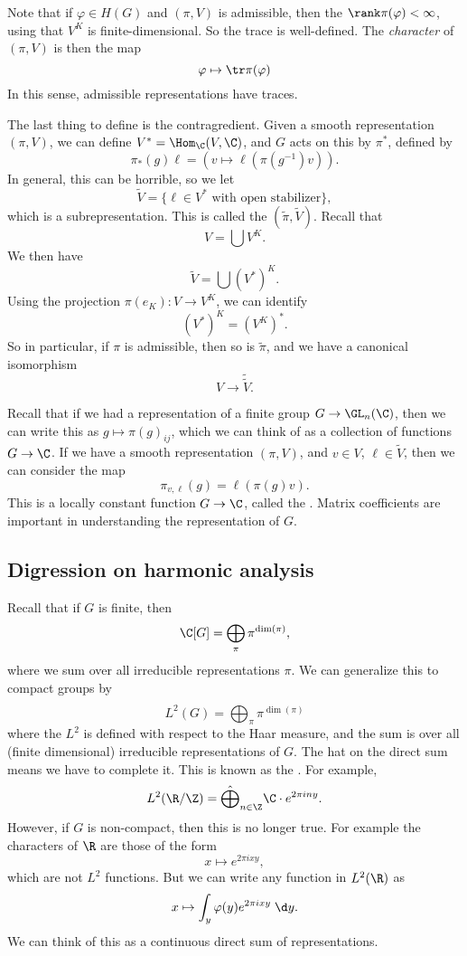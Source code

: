 \documentclass[a4paper]{article}
\begin{document}
Note that if $\varphi \in H(G)$ and $(\pi, V)$ is admissible, then the $\rank \pi(\varphi) < \infty$, using that $V^K$ is finite-dimensional. So the trace is well-defined. The \emph{character} of $(\pi, V)$ is then the map
\[
  \varphi \mapsto \tr \pi(\varphi)
\]
In this sense, admissible representations have traces.

The last thing to define is the contragredient. Given a smooth representation $(\pi, V)$,  we can define $V^* = \Hom_\C(V, \C)$, and $G$ acts on this by $\pi^*$, defined by
\[
  \pi_*(g)\ell = (v \mapsto \ell(\pi(g^{-1})v)).
\]
In general, this can be horrible, so we let
\[
  \tilde{V} = \{\ell \in V^* \text{ with open stabilizer}\},
\]
which is a subrepresentation. This is called the  $(\tilde{\pi}, \tilde{V})$. Recall that
\[
  V = \bigcup V^K.
\]
We then have
\[
  \tilde{V} = \bigcup (V^*)^K.
\]
Using the projection $\pi(e_K): V \to V^K$, we can identify
\[
  (V^*)^K = (V^K)^*.
\]
So in particular, if $\pi$ is admissible, then so is $\tilde{\pi}$, and we have a canonical isomorphism
\[
  V \to \tilde{\tilde{V}}.
\]

Recall that if we had a representation of a finite group $G \to \GL_n(\C)$, then we can write this as $g \mapsto \pi(g)_{ij}$, which we can think of as a collection of functions $G \to \C$. If we have a smooth representation $(\pi, V)$, and $v \in V$, $\ell \in \tilde{V}$, then we can consider the map
\[
  \pi_{v, \ell}(g) = \ell(\pi(g) v).
\]
This is a locally constant function $G \to \C$, called the . Matrix coefficients are important in understanding the representation of $G$.

\subsection{Digression on harmonic analysis}
Recall that if $G$ is finite, then
\[
  \C[G] = \bigoplus_{\pi} \pi^{\dim  (\pi)},
\]
where we sum over all irreducible representations $\pi$. We can generalize this to compact groups by
\[
  L^2(G) = \hat{\bigoplus_{\pi}} \pi^{\dim (\pi)}
\]
where the $L^2$ is defined with respect to the Haar measure, and the sum is over all (finite dimensional) irreducible representations of $G$. The hat on the direct sum means we have to complete it. This is known as the . For example,
\[
  L^2(\R/\Z) = \hat{\bigoplus}_{n \in \Z} \C \cdot e^{2\pi i n y}.
\]
However, if $G$ is non-compact, then this is no longer true. For example the characters of $\R$ are those of the form
\[
  x \mapsto e^{2\pi i xy},
\]
which are not $L^2$ functions. But we can write any function in $L^2(\R)$ as
\[
  x \mapsto \int_y \varphi(y) e^{2\pi i xy} \;\d y.
\]
We can think of this as a continuous direct sum of representations.
\end{document}
